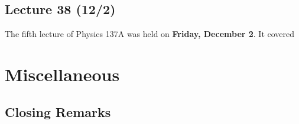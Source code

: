 \documentclass{book}
\theoremstyle{plain}
\begin{document}
      \chapter{Lecture 38 (12/2)}
        The fifth lecture of Physics 137A was held on \textbf{Friday, December 2}. It covered
        
      

    \part{Miscellaneous}
      \chapter{Closing Remarks}


  
\end{document}
